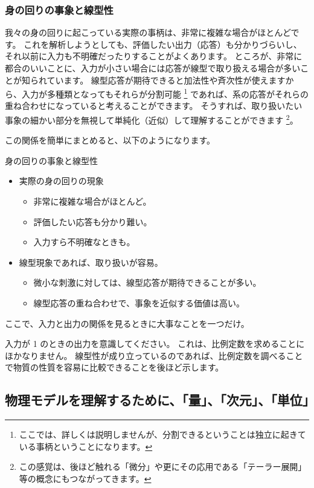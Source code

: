 \documentclass[uplatex,dvipdfmx,a4paper,11pt]{jsarticle}
\begin{document}
\subsubsection{身の回りの事象と線型性}
我々の身の回りに起こっている実際の事柄は、非常に複雑な場合がほとんどです。
これを解析しようとしても、評価したい出力（応答）も分かりづらいし、それ以前に入力も不明確だったりすることがよくあります。
ところが、非常に都合のいいことに、入力が小さい場合には応答が線型で取り扱える場合が多いことが知られています。
線型応答が期待できると加法性や斉次性が使えますから、入力が多種類となってもそれらが分割可能
\footnote{
	ここでは、詳しくは説明しませんが、分割できるということは独立に起きている事柄ということになります。
}
であれば、系の応答がそれらの重ね合わせになっていると考えることができます。
そうすれば、取り扱いたい事象の細かい部分を無視して単純化（近似）して理解することができます
\footnote{
	この感覚は、後ほど触れる「微分」や更にその応用である「テーラー展開」等の概念にもつながってきます。
}。

この関係を簡単にまとめると、以下のようになります。
\large
\begin{itembox}[l]{身の回りの事象と線型性}
	\begin{itemize}
		\item 実際の身の回りの現象
		\begin{itemize}
			\item 非常に複雑な場合がほとんど。
			\item 評価したい応答も分かり難い。
			\item 入力すら不明確なときも。
		\end{itemize}
		\item 線型現象であれば、取り扱いが容易。
		\begin{itemize}
			\item 微小な刺激に対しては、線型応答が期待できることが多い。
			\item 線型応答の重ね合わせで、事象を近似する価値は高い。
		\end{itemize}
	\end{itemize}	
\end{itembox}
\normalsize
ここで、入力と出力の関係を見るときに大事なことを一つだけ。

入力が 1 のときの出力を意識してください。
これは、比例定数を求めることにほかなりません。
線型性が成り立っているのであれば、比例定数を調べることで物質の性質を容易に比較できることを後ほど示します。

\subsection{物理モデルを理解するために、「量」、「次元」、「単位」}
\end{document}

